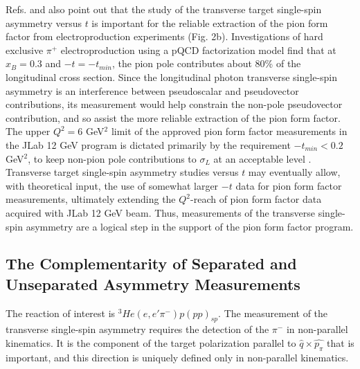 Refs. \cite{Go01} and \cite{Fr00} also point out that the study of the
transverse target single-spin asymmetry versus $t$ is important for the
reliable extraction of the pion form factor from electroproduction experiments
(Fig. 2b).  Investigations of hard exclusive $\pi^+$ electroproduction using a
pQCD factorization model \cite{Ma99,Ca90} find that at $x_B=0.3$ and
$-t=-t_{min}$, the pion pole contributes about 80\% of the longitudinal cross
section.  Since the longitudinal photon transverse single-spin asymmetry is an
interference between
pseudoscalar and pseudovector contributions, its measurement would help
constrain the non-pole pseudovector contribution, and so assist the more
reliable extraction of the pion form factor.  The upper $Q^2=6$ GeV$^2$ limit
of the approved pion form factor measurements in the JLab 12 GeV program
\cite{12GeV} is dictated primarily by the requirement $-t_{min}<0.2$ GeV$^2$,
to keep non-pion pole contributions to $\sigma_L$ at an acceptable level
\cite{Ca90}.  Transverse target single-spin asymmetry studies versus $t$ may
eventually allow, with theoretical input, the use of somewhat larger $-t$ data
for pion form factor measurements, ultimately extending the $Q^2$-reach of pion
form factor data acquired with JLab 12 GeV beam.  Thus, measurements of
the transverse single-spin asymmetry are a logical step in the support of the
pion form factor program.

\subsection{The Complementarity of Separated and Unseparated Asymmetry
  Measurements}

The reaction of interest is $^3He(e,e'\pi^-)p(pp)_{sp}$.
The measurement of the transverse single-spin asymmetry requires the detection
of the $\pi^-$ in non-parallel kinematics.  It is the component of the target
polarization parallel to $\hat{q}\times\hat{p_{\pi}}$ that is important, and
this direction is uniquely defined only in non-parallel kinematics.

